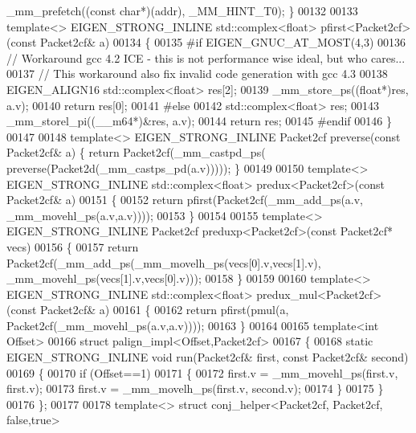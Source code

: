 \begin{DoxyCode}
      \_mm\_prefetch((\textcolor{keyword}{const} \textcolor{keywordtype}{char}*)(addr), \_MM\_HINT\_T0); \}
00132 
00133 \textcolor{keyword}{template}<> EIGEN\_STRONG\_INLINE std::complex<float>  pfirst<Packet2cf>(\textcolor{keyword}{const} Packet2cf& a)
00134 \{
00135 \textcolor{preprocessor}{  #if EIGEN\_GNUC\_AT\_MOST(4,3)}
00136   \textcolor{comment}{// Workaround gcc 4.2 ICE - this is not performance wise ideal, but who cares...}
00137   \textcolor{comment}{// This workaround also fix invalid code generation with gcc 4.3}
00138   EIGEN\_ALIGN16 std::complex<float> res[2];
00139   \_mm\_store\_ps((\textcolor{keywordtype}{float}*)res, a.v);
00140   \textcolor{keywordflow}{return} res[0];
00141 \textcolor{preprocessor}{  #else}
00142   std::complex<float> res;
00143   \_mm\_storel\_pi((\_\_m64*)&res, a.v);
00144   \textcolor{keywordflow}{return} res;
00145 \textcolor{preprocessor}{  #endif}
00146 \}
00147 
00148 \textcolor{keyword}{template}<> EIGEN\_STRONG\_INLINE Packet2cf preverse(\textcolor{keyword}{const} Packet2cf& a) \{ \textcolor{keywordflow}{return} Packet2cf(\_mm\_castpd\_ps(
      preverse(Packet2d(\_mm\_castps\_pd(a.v))))); \}
00149 
00150 \textcolor{keyword}{template}<> EIGEN\_STRONG\_INLINE std::complex<float> predux<Packet2cf>(\textcolor{keyword}{const} Packet2cf& a)
00151 \{
00152   \textcolor{keywordflow}{return} pfirst(Packet2cf(\_mm\_add\_ps(a.v, \_mm\_movehl\_ps(a.v,a.v))));
00153 \}
00154 
00155 \textcolor{keyword}{template}<> EIGEN\_STRONG\_INLINE Packet2cf preduxp<Packet2cf>(\textcolor{keyword}{const} Packet2cf* vecs)
00156 \{
00157   \textcolor{keywordflow}{return} Packet2cf(\_mm\_add\_ps(\_mm\_movelh\_ps(vecs[0].v,vecs[1].v), \_mm\_movehl\_ps(vecs[1].v,vecs[0].v)));
00158 \}
00159 
00160 \textcolor{keyword}{template}<> EIGEN\_STRONG\_INLINE std::complex<float> predux\_mul<Packet2cf>(\textcolor{keyword}{const} Packet2cf& a)
00161 \{
00162   \textcolor{keywordflow}{return} pfirst(pmul(a, Packet2cf(\_mm\_movehl\_ps(a.v,a.v))));
00163 \}
00164 
00165 \textcolor{keyword}{template}<\textcolor{keywordtype}{int} Offset>
00166 \textcolor{keyword}{struct }palign\_impl<Offset,Packet2cf>
00167 \{
00168   \textcolor{keyword}{static} EIGEN\_STRONG\_INLINE \textcolor{keywordtype}{void} run(Packet2cf& first, \textcolor{keyword}{const} Packet2cf& second)
00169   \{
00170     \textcolor{keywordflow}{if} (Offset==1)
00171     \{
00172       first.v = \_mm\_movehl\_ps(first.v, first.v);
00173       first.v = \_mm\_movelh\_ps(first.v, second.v);
00174     \}
00175   \}
00176 \};
00177 
00178 \textcolor{keyword}{template}<> \textcolor{keyword}{struct }conj\_helper<Packet2cf, Packet2cf, false,true>

\end{DoxyCode}
